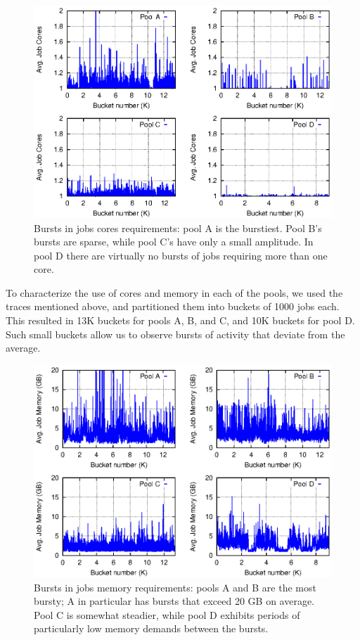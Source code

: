 \begin{figure}\centering
	\includegraphics{figures/cores_burst.eps}
\caption{Bursts in jobs cores requirements: pool A is the burstiest.
  Pool B's bursts are sparse, while pool C's have only a small
  amplitude.
  In pool D there are virtually no bursts of jobs requiring more than
  one core.}
\label{fig:cores_burst_multiplot}
\end{figure}

To characterize the use of cores and memory in each of the pools, 
we used the traces mentioned above, 
and partitioned them into buckets of 1000 jobs each. 
This resulted in 13K buckets for pools A, B, and C, 
and 10K buckets for pool D.
Such small buckets allow us to observe bursts of activity that deviate
from the average.

\begin{figure}\centering
	\includegraphics{figures/memory_burst.eps}
\caption{Bursts in jobs memory requirements: pools A and B are the
  most bursty; A in particular has bursts that exceed 20 GB on average.
  Pool C is somewhat steadier, while pool D exhibits periods of
  particularly low memory demands between the bursts.}
\label{fig:memory_burst_multiplot}
\end{figure}

